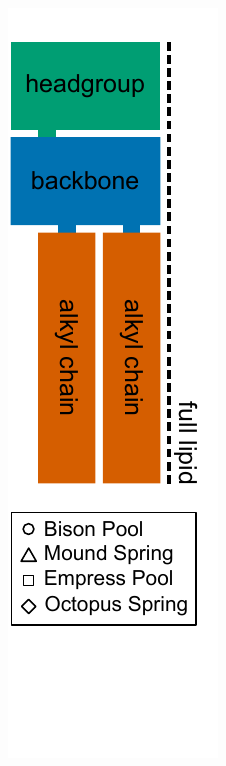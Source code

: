 {\begin{figure}[h]
\begin{subfigure}[b]{0.18\linewidth}
        	\includegraphics[width=1\linewidth]{figs_ch1/BasicLipidSchematic.pdf}

\end{subfigure}
\end{figure}}
